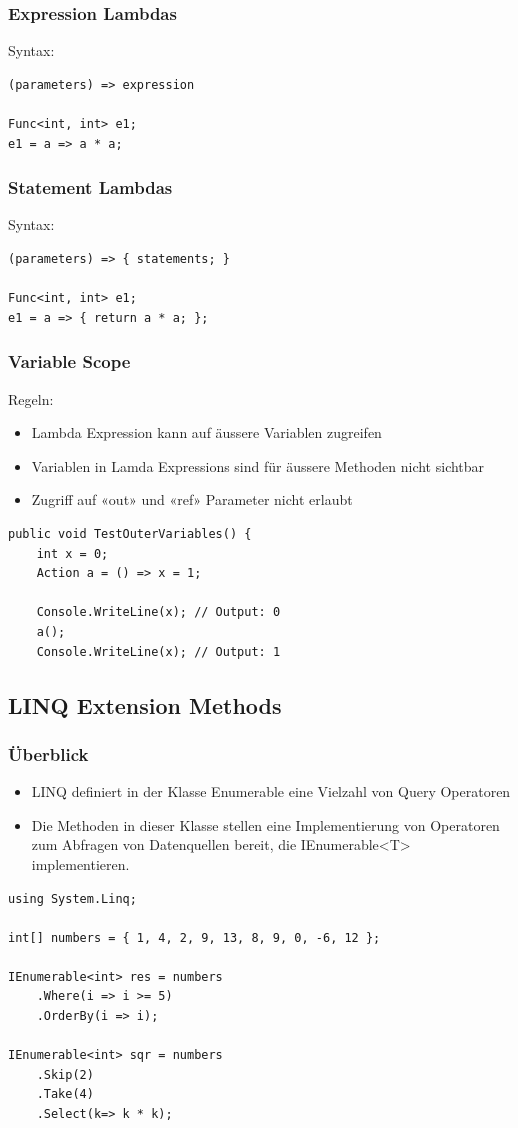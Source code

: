 \subsubsection{Expression Lambdas}
Syntax:
\begin{lstlisting}
(parameters) => expression

Func<int, int> e1;
e1 = a => a * a;
\end{lstlisting}


\subsubsection{Statement Lambdas}
Syntax:
\begin{lstlisting}
(parameters) => { statements; }

Func<int, int> e1;
e1 = a => { return a * a; };
\end{lstlisting}

\subsubsection{Variable Scope}
Regeln:
\begin{itemize}
    \item Lambda Expression kann auf äussere Variablen zugreifen
    \item Variablen in Lamda Expressions sind für äussere Methoden nicht sichtbar
    \item Zugriff auf «out» und «ref» Parameter nicht erlaubt
\end{itemize}
\begin{lstlisting}
public void TestOuterVariables() {
    int x = 0;
    Action a = () => x = 1;

    Console.WriteLine(x); // Output: 0
    a();
    Console.WriteLine(x); // Output: 1
\end{lstlisting}


\subsection{LINQ Extension Methods}

\subsubsection{Überblick}
\begin{itemize}
    \item LINQ definiert in der Klasse Enumerable eine Vielzahl von Query Operatoren
    \item  Die Methoden in dieser Klasse stellen eine Implementierung von Operatoren zum Abfragen von Datenquellen bereit, die IEnumerable<T> implementieren.
\end{itemize}
\begin{lstlisting}
using System.Linq;

int[] numbers = { 1, 4, 2, 9, 13, 8, 9, 0, -6, 12 };

IEnumerable<int> res = numbers
    .Where(i => i >= 5)
    .OrderBy(i => i);

IEnumerable<int> sqr = numbers
    .Skip(2)
    .Take(4)
    .Select(k=> k * k);
\end{lstlisting}

